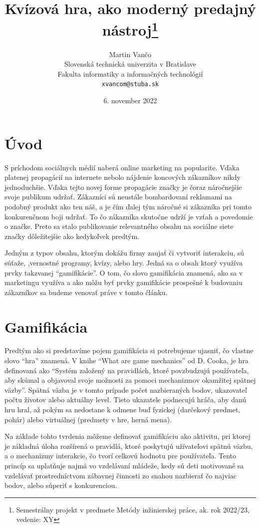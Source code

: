\documentclass[10pt,twoside,slovak,a4paper]{article}
\title{Kvízová hra, ako moderný predajný nástroj\thanks{Semestrálny projekt v predmete Metódy inžinierskej práce, ak. rok 2022/23, vedenie: XY}}
\author{Martin Vančo\\[2pt]
	{\small Slovenská technická univerzita v Bratislave}\\
	{\small Fakulta informatiky a informačných technológií}\\
	{\small \texttt{xvancom@stuba.sk}}
}
\date{\small 6. november 2022}
\begin{document}
\maketitle

\begin{abstract}
	

\end{abstract}

\section{Úvod}\label{uvod}
	S príchodom sociálnych médií naberá online marketing na popularite. Vďaka platenej propagácií na internete nebolo nájdenie koncových zákazníkov nikdy jednoduchšie. Vďaka tejto novej forme propagácie značky je čoraz náročnejšie svoje publikum udržať. Zákazníci sú neustále bombardovaní reklamami na podobný produkt ako ten náš, a je čím ďalej tým náročné si zákazníka pri tomto konkurenčnom boji udržať. To čo zákazníka skutočne udrží je vzťah a povedomie o značke. Preto sa stalo publikovanie relevantného obsahu na sociálne siete značky dôležitejšie ako kedykoľvek predtým.
	
	Jedným z typov obsahu, ktorým dokážu firmy zaujať či vytvoriť interakciu, sú súťaže, ,vernostné programy, kvízy, alebo hry. Jedná sa o obsah ktorý využíva prvky takzvanej “gamifikácie”. O tom, čo slovo gamifikácia znamená, ako sa v marketingu využíva a ako môžu byť prvky gamifikácie prospešné k budovaniu zákazníkov sa budeme venovať práve v tomto článku.


\section{Gamifikácia}\label{gamifikacia}
	Predtým ako si predstavíme pojem gamifikácia si potrebujeme ujasniť, čo vlastne slovo “hra” znamená. V knihe “What are game mechanics”  od D. Cooka, je hra definovaná ako “Systém založený na pravidlách, ktoré povzbudzujú používateľa, aby skúmal a objavoval svoje možnosti za pomoci mechanizmov okamžitej spätnej väzby”. Spätná väzba je v tomto prípade počet nazbieraných bodov, ukazovateľ počtu životov alebo aktuálny level. Tieto ukazatele podnecujú hráča, aby danú hru hral, až pokým sa nedostane k odmene buď fyzickej (darčekový predmet, pohár) alebo virtuálnej (predmety v hre, herná mena). 
	
	Na základe tohto tvrdenia môžeme definovať gamifikáciu ako aktivitu, pri ktorej je základná úloha rozšírená o pravidlá, ktoré poskytujú užívateľovi spätnú väzbu, a o mechanizmy interakcie, čo tvorí celkovú hodnotu pre používateľa. Tento princíp sa uplatňuje najmä vo vzdelávaní mládeže, kedy sú deti motivované sa vzdelávať prostredníctvom zábavnej činnosti zo snahou nazbierať čo najviac bodov, alebo súperiť s konkurenciou.
\end{document}
